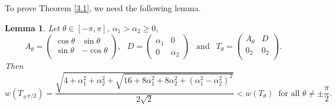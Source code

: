 \documentclass[11pt]{article}
\newtheorem{lemma}[theorem]{Lemma}
\numberwithin{equation}{section}
\begin{document}
To prove Theorem \ref{3.1}, we need the following lemma.

\begin{lemma}\label{p31}
Let $\theta\in [-\pi,\pi]$, $\alpha_1>\alpha_2\ge 0$,
$$A_\theta=\left(
                                            \begin{array}{cc}
                                              \cos\theta & \sin\theta \\
                                              \sin\theta & -\cos\theta \\
                                            \end{array}
                                          \right),  \ \ \
                                          D=\begin{pmatrix} \alpha_1 & 0 \\ 0 & \alpha_2\end{pmatrix} \ \ \mbox{ and } \ \ T_\theta=\left(
                \begin{array}{cc}
                  A_\theta & D \\
                  0_2 & 0_2 \\
                \end{array}
              \right).$$
Then
$$ w(T_{\pm\pi/2})
=\frac{\sqrt{4+\alpha_1^2+\alpha_2^2+\sqrt{16+8\alpha_1^2+8\alpha_2^2+(\alpha_1^2-\alpha_2^2)^2}}}{2\sqrt{2}} < w(T_\theta) \  \mbox{ for all } \theta\neq \pm \frac{\pi}{2}.
$$
\end{lemma}
\end{document}
